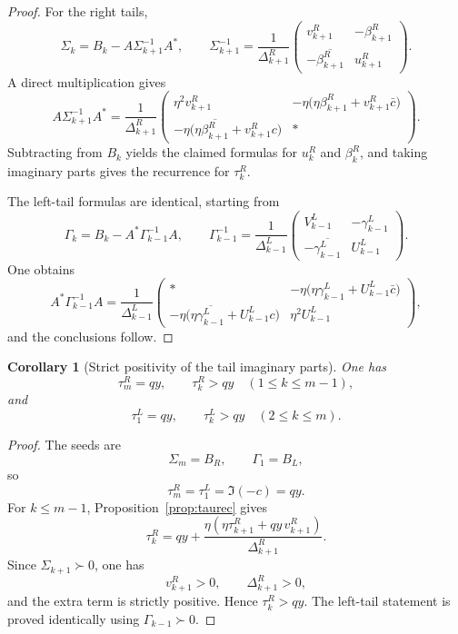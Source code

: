 \documentclass[11pt]{article}
\newtheorem{corollary}[theorem]{Corollary}
\begin{document}
\begin{proof}
For the right tails,
\[
\Sigma_k=B_k-A\Sigma_{k+1}^{-1}A^*,
\qquad
\Sigma_{k+1}^{-1}
=
\frac1{\Delta_{k+1}^R}
\begin{pmatrix}
v_{k+1}^R & -\beta_{k+1}^R\\
-\overline{\beta_{k+1}^R} & u_{k+1}^R
\end{pmatrix}.
\]
A direct multiplication gives
\[
A\Sigma_{k+1}^{-1}A^*
=
\frac1{\Delta_{k+1}^R}
\begin{pmatrix}
\eta^2 v_{k+1}^R &
-\eta\bigl(\eta\beta_{k+1}^R+v_{k+1}^R\bar c\bigr)
\\[1ex]
-\eta\bigl(\eta\overline{\beta_{k+1}^R}+v_{k+1}^R c\bigr) &
*
\end{pmatrix}.
\]
Subtracting from \(B_k\) yields the claimed formulas for \(u_k^R\) and \(\beta_k^R\), and
taking imaginary parts gives the recurrence for \(\tau_k^R\).

The left-tail formulas are identical, starting from
\[
\Gamma_k=B_k-A^*\Gamma_{k-1}^{-1}A,
\qquad
\Gamma_{k-1}^{-1}
=
\frac1{\Delta_{k-1}^L}
\begin{pmatrix}
V_{k-1}^L & -\gamma_{k-1}^L\\
-\overline{\gamma_{k-1}^L} & U_{k-1}^L
\end{pmatrix}.
\]
One obtains
\[
A^*\Gamma_{k-1}^{-1}A
=
\frac1{\Delta_{k-1}^L}
\begin{pmatrix}
* &
-\eta\bigl(\eta\gamma_{k-1}^L+U_{k-1}^L\bar c\bigr)
\\[1ex]
-\eta\bigl(\eta\overline{\gamma_{k-1}^L}+U_{k-1}^L c\bigr) &
\eta^2 U_{k-1}^L
\end{pmatrix},
\]
and the conclusions follow.
\end{proof}

\begin{corollary}[Strict positivity of the tail imaginary parts]\label{cor:taupos}
One has
\[
\tau_m^R=qy,
\qquad
\tau_k^R>qy
\quad (1\le k\le m-1),
\]
and
\[
\tau_1^L=qy,
\qquad
\tau_k^L>qy
\quad (2\le k\le m).
\]
\end{corollary}

\begin{proof}
The seeds are
\[
\Sigma_m=B_R,
\qquad
\Gamma_1=B_L,
\]
so
\[
\tau_m^R=\tau_1^L=\Im(-c)=qy.
\]
For \(k\le m-1\), Proposition~\ref{prop:taurec} gives
\[
\tau_k^R
=
qy+\frac{\eta(\eta\tau_{k+1}^R+qy\,v_{k+1}^R)}{\Delta_{k+1}^R}.
\]
Since \(\Sigma_{k+1}\succ 0\), one has
\[
v_{k+1}^R>0,
\qquad
\Delta_{k+1}^R>0,
\]
and the extra term is strictly positive. Hence \(\tau_k^R>qy\). The left-tail statement is
proved identically using \(\Gamma_{k-1}\succ 0\).
\end{proof}
\end{document}
